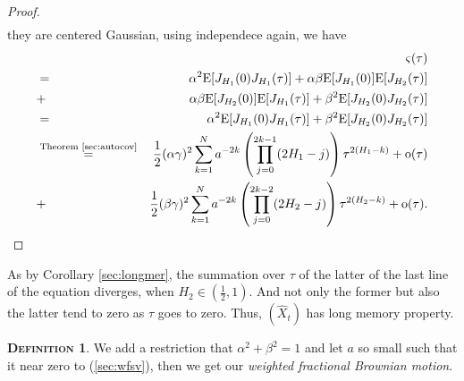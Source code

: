 \documentclass[a4paper, twoside, 11pt]{article}
\theoremstyle{definition}
\newtheorem{definition}{\scshape Definition}[section]
\newcommand{\brkt}[1]{\left({#1} \right)}
\begin{document}
\begin{proof}
\begin{eqnarray*}
  \end{eqnarray*}
   they are centered Gaussian, using independece again, we have
  \begin{eqnarray*}
	&&\varsigma(\tau) \\
	&=& \alpha^2\mathrm{E}[J_{H_1}(0) J_{H_1}(\tau)] + \alpha\beta\mathrm{E}[J_{H_1}(0)]\mathrm{E}[J_{H_2}(\tau)] \\
	&+& \alpha\beta\mathrm{E}[J_{H_2}(0)]\mathrm{E}[J_{H_1}(\tau)] + \beta^2\mathrm{E}[J_{H_2}(0)J_{H_2}(\tau)]\\
	&=& \alpha^2\mathrm{E}[J_{H_1}(0) J_{H_1}(\tau)] + \beta^2\mathrm{E}[J_{H_2}(0)J_{H_2}(\tau)]\\
  &\overset{\text{Theorem \ref{sec:autocov}}}{=}& \frac{1}{2} (\alpha\gamma)^2 \sum_{k=1}^{N} a^{-2k}\brkt{\prod_{j=0}^{2k-1}(2H_1-j)}\tau^{2(H_1-k)} + \mathrm{o}(\tau)\\
  &+& \frac{1}{2} (\beta\gamma)^2 \sum_{k=1}^{N} a^{-2k}\brkt{\prod_{j=0}^{2k-2}(2H_2-j)}\tau^{2(H_2-k)} + \mathrm{o}(\tau).
  \end{eqnarray*}
  \end{proof}
  As by Corollary \ref{sec:longmer}, the summation over $\tau$ of the latter of the last line of the equation diverges, when $H_2 \in (\frac{1}{2}, 1)$. And not only the former but also the latter tend to zero as $\tau$ goes to zero. Thus, $(\hat{X}_t)$ has long memory property. 

  \begin{definition}
	We add a restriction that $\alpha^2 + \beta^2 = 1$ and let $a$ so small such that it near zero to (\ref{sec:wfsv}), then we get our \emph{weighted fractional Brownian motion}.
  \end{definition}
  
\end{document}
